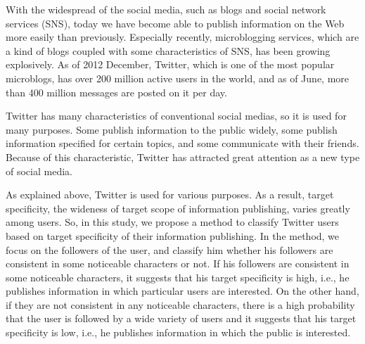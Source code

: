 \begin{eabstract}

With the widespread of the social media, such as blogs and social
 network services (SNS), today we have become able to publish
 information on the Web more easily than previously.  Especially
 recently, microblogging services, which are a kind of blogs coupled
 with some characteristics of SNS, has been growing explosively. As of
 2012 December, Twitter, which is one of the most popular microblogs, has
 over 200 million active users in the world, and as of June, more than
 400 million messages are posted on it per day.

Twitter has many characteristics of conventional social medias, so it is
 used for many purposes. Some publish information to the public
 widely, some publish information specified for certain topics, and
 some communicate with their friends. Because of this characteristic,
 Twitter has attracted great attention as a new type of social media.

As explained above, Twitter is used for various purposes.  As a result,
 target specificity, the wideness of target scope of information
 publishing, varies greatly among users.  So, in this study, we propose a
 method to classify Twitter users based on target specificity of their
 information publishing.  In the method, we focus on the followers of
 the user, and classify him whether his followers are consistent in some
 noticeable characters or not.  If his followers are consistent in some
 noticeable characters, it suggests that his target specificity is high,
 i.e., he publishes information in which particular users are
 interested. On the other hand, if they are not consistent in any
 noticeable characters, there is a high probability that the user is
 followed by a wide variety of users and it suggests that his target
 specificity is low, i.e., he publishes information in which the public
 is interested.


\end{eabstract}
